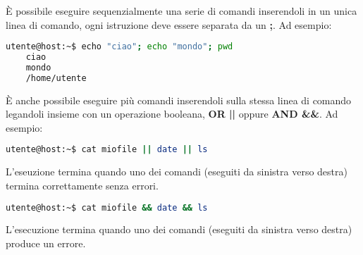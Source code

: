 \documentclass[../main.tex]{subfiles}
\begin{document}
È possibile eseguire sequenzialmente una serie di comandi inserendoli in un unica linea di comando, ogni istruzione deve essere
separata da un \textbf{;}. Ad esempio:
\begin{lstlisting}[language=bash, frame=l]
    utente@host:~$ echo "ciao"; echo "mondo"; pwd
    ciao
    mondo
    /home/utente
\end{lstlisting}
\vspace{1.5cm}

È anche possibile eseguire più comandi inserendoli sulla stessa linea di comando legandoli insieme con un operazione booleana, \textbf{OR ||}
oppure \textbf{AND \&\&}. Ad esempio:
\begin{lstlisting}[language=bash, frame=l]
    utente@host:~$ cat miofile || date || ls
\end{lstlisting}
L'eseuzione termina quando uno dei comandi (eseguiti da sinistra verso destra) termina correttamente senza errori.
\vspace{1cm}

\begin{lstlisting}[language=bash, frame=l]
    utente@host:~$ cat miofile && date && ls
\end{lstlisting}
L'esecuzione termina quando uno dei comandi (eseguiti da sinistra verso destra) produce un errore.
\end{document}

